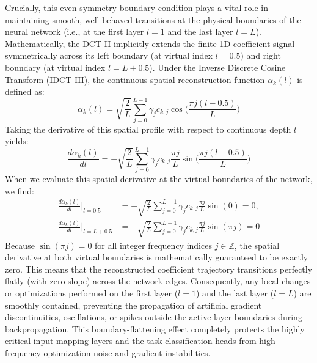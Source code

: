 Crucially, this even-symmetry boundary condition plays a vital role in maintaining smooth, well-behaved transitions at the physical boundaries of the neural network (i.e., at the first layer $l=1$ and the last layer $l=L$). Mathematically, the DCT-II implicitly extends the finite 1D coefficient signal symmetrically across its left boundary (at virtual index $l = 0.5$) and right boundary (at virtual index $l = L + 0.5$). Under the Inverse Discrete Cosine Transform (IDCT-III), the continuous spatial reconstruction function $\alpha_k(l)$ is defined as:
\begin{equation}
    \alpha_k(l) = \sqrt{\frac{2}{L}} \sum_{j=0}^{L-1} \gamma_j c_{k,j} \cos\bigl( \frac{\pi j (l - 0.5)}{L} \bigr)
\end{equation}
Taking the derivative of this spatial profile with respect to continuous depth $l$ yields:
\begin{equation}
    \frac{d \alpha_k(l)}{d l} = -\sqrt{\frac{2}{L}} \sum_{j=0}^{L-1} \gamma_j c_{k,j} \frac{\pi j}{L} \sin\bigl( \frac{\pi j (l - 0.5)}{L} \bigr)
\end{equation}
When we evaluate this spatial derivative at the virtual boundaries of the network, we find:
\begin{align}
    \frac{d \alpha_k(l)}{d l} \Big|_{l = 0.5} &= -\sqrt{\frac{2}{L}} \sum_{j=0}^{L-1} \gamma_j c_{k,j} \frac{\pi j}{L} \sin(0) = 0, \\
    \frac{d \alpha_k(l)}{d l} \Big|_{l = L + 0.5} &= -\sqrt{\frac{2}{L}} \sum_{j=0}^{L-1} \gamma_j c_{k,j} \frac{\pi j}{L} \sin(\pi j) = 0
\end{align}
Because $\sin(\pi j) = 0$ for all integer frequency indices $j \in \mathbb{Z}$, the spatial derivative at both virtual boundaries is mathematically guaranteed to be exactly zero. This means that the reconstructed coefficient trajectory transitions perfectly flatly (with zero slope) across the network edges. Consequently, any local changes or optimizations performed on the first layer ($l=1$) and the last layer ($l=L$) are smoothly contained, preventing the propagation of artificial gradient discontinuities, oscillations, or spikes outside the active layer boundaries during backpropagation. This boundary-flattening effect completely protects the highly critical input-mapping layers and the task classification heads from high-frequency optimization noise and gradient instabilities.

